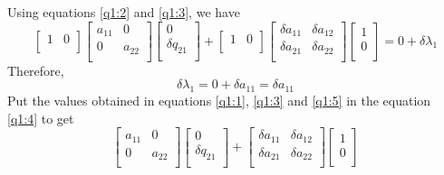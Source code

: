 \documentclass{article}
\begin{document}
\begin{enumerate}
    Using equations \ref{q1:2} and \ref{q1:3}, we have
    $$\begin{bmatrix}
        1 & 0\\
    \end{bmatrix}\begin{bmatrix}
        a_{11} & 0\\
        0 & a_{22}\\
    \end{bmatrix}\begin{bmatrix}
        0\\
        \delta q_{21}\\
    \end{bmatrix} + \begin{bmatrix}
        1 & 0\\
    \end{bmatrix}\begin{bmatrix}
        \delta a_{11} & \delta a_{12}\\
        \delta a_{21} & \delta a_{22}\\
    \end{bmatrix}\begin{bmatrix}
        1\\
        0\\
    \end{bmatrix} = 0 + \delta \lambda_1$$
    Therefore,
    \begin{equation}
    \delta\lambda_1 = 0 + \delta a_{11} = \delta a_{11}
    \label{q1:5}
    \end{equation}
    Put the values obtained in equations \ref{q1:1}, \ref{q1:3} and \ref{q1:5} in the equation \ref{q1:4} to get
    $$\begin{bmatrix}
        a_{11} & 0\\
        0 & a_{22}\\
    \end{bmatrix}\begin{bmatrix}
        0\\
        \delta q_{21}\\
    \end{bmatrix} + \begin{bmatrix}
        \delta a_{11} & \delta a_{12}\\
        \delta a_{21} & \delta a_{22}\\
    \end{bmatrix}\begin{bmatrix}
        1\\
        0\\

\end{bmatrix}$$
\end{enumerate}
\end{document}
